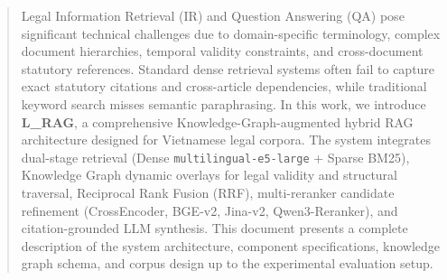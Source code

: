 \documentclass[12pt]{article}
\begin{document}


\tableofcontents
\pagebreak

\begin{abstract}
Legal Information Retrieval (IR) and Question Answering (QA) pose significant technical challenges due to domain-specific terminology, complex document hierarchies, temporal validity constraints, and cross-document statutory references. Standard dense retrieval systems often fail to capture exact statutory citations and cross-article dependencies, while traditional keyword search misses semantic paraphrasing. In this work, we introduce \textbf{L\_RAG}, a comprehensive Knowledge-Graph-augmented hybrid RAG architecture designed for Vietnamese legal corpora. The system integrates dual-stage retrieval (Dense \texttt{multilingual-e5-large} + Sparse BM25), Knowledge Graph dynamic overlays for legal validity and structural traversal, Reciprocal Rank Fusion (RRF), multi-reranker candidate refinement (CrossEncoder, BGE-v2, Jina-v2, Qwen3-Reranker), and citation-grounded LLM synthesis. This document presents a complete description of the system architecture, component specifications, knowledge graph schema, and corpus design up to the experimental evaluation setup.
\end{abstract}

\newpage

\setcounter{page}{1}






% 
% 
% 
% 
\end{document}

